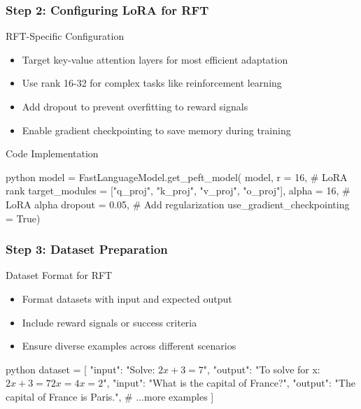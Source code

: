 \documentclass[aspectratio=169]{beamer}
\begin{document}
\begin{frame}[fragile]
	\frametitle{Step 2: Configuring LoRA for RFT}
	\begin{block}{RFT-Specific Configuration}
		\begin{itemize}
			\item Target key-value attention layers for most efficient adaptation
			\item Use rank 16-32 for complex tasks like reinforcement learning
			\item Add dropout to prevent overfitting to reward signals
			\item Enable gradient checkpointing to save memory during training
		\end{itemize}
	\end{block}
	\begin{block}{Code Implementation}
		\begin{mintedbox}{python}
model = FastLanguageModel.get_peft_model(
    model,
    r = 16,  # LoRA rank
    target_modules = ["q_proj", "k_proj", "v_proj", "o_proj"],
    alpha = 16,  # LoRA alpha
    dropout = 0.05,  # Add regularization
    use_gradient_checkpointing = True)
		\end{mintedbox}
	\end{block}
\end{frame}

\begin{frame}[fragile]
	\frametitle{Step 3: Dataset Preparation}
	\begin{block}{Dataset Format for RFT}
		\begin{itemize}
			\item Format datasets with input and expected output
			\item Include reward signals or success criteria
			\item Ensure diverse examples across different scenarios
		\end{itemize}
	\end{block}
	\begin{mintedbox}{python}
dataset = [
    {"input": "Solve: $2x + 3 = 7$", 
     "output": "To solve for x:\n$2x + 3 = 7$\n$2x = 4$\n$x = 2$"},
    {"input": "What is the capital of France?", 
     "output": "The capital of France is Paris."},
    # ...more examples
]
	\end{mintedbox}
\end{frame}
\end{document}

